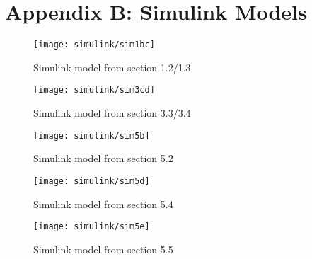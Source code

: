 \section{Appendix B: Simulink Models}

\begin{figure}[!htb]
    \caption{Simulink model from section 1.2/1.3}
    \centering
    \centerline{\texttt{[image: simulink/sim1bc]}}
    \label{simulink:1b}
\end{figure}

\begin{figure}[!htb]
    \caption{Simulink model from section 3.3/3.4}
    \centering
    \centerline{\texttt{[image: simulink/sim3cd]}}

\end{figure}

\begin{figure}[!htb]
    \caption{Simulink model from section 5.2}
    \centering
    \centerline{\texttt{[image: simulink/sim5b]}}

\end{figure}

\begin{figure}[!htb]
    \caption{Simulink model from section 5.4}
    \centering
    \centerline{\texttt{[image: simulink/sim5d]}}

\end{figure}

\begin{figure}[!htb]
    \caption{Simulink model from section 5.5}
    \centering
    \centerline{\texttt{[image: simulink/sim5e]}}

\end{figure}
